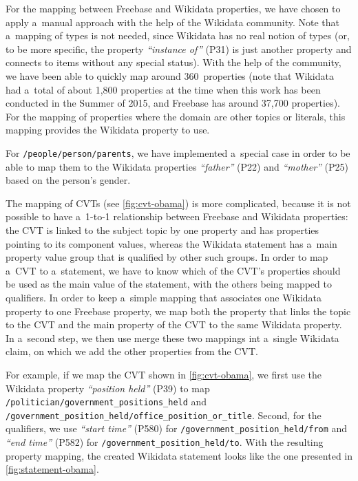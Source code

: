 \documentclass{sig-alternate-2013}
\begin{document}
For the mapping between Freebase and Wikidata properties, we have chosen to apply a~manual
approach with the help of the Wikidata community.
Note that a~mapping of types is not needed, since Wikidata has no real notion of types
(or, to be more specific, the property \textit{``instance of''} (P31) is just another
property and connects to items without any special status).
With the help of the community, we have been able to quickly map around 360~properties
(note that Wikidata had a~total of about 1,800 properties at the time when this work
has been conducted in the Summer of 2015, and Freebase has around 37,700 properties).
For the mapping of properties where the domain are other topics or literals,
this mapping provides the Wikidata property to use.

For \texttt{/people/person/parents}, we have implemented a~special case
in order to be able to map them to the Wikidata properties
\textit{``father''} (P22) and \textit{``mother''} (P25)
based on the person's gender.

The mapping of CVTs (see \autoref{fig:cvt-obama}) is more complicated,
because it is not possible to have a~\mbox{1-to-1} relationship
between Freebase and Wikidata properties: the CVT is linked to the subject topic by one property
and has properties pointing to its component values, whereas the Wikidata statement
has a~main property value group that is qualified by other such groups.
In order to map a~CVT to a~statement, we have to know which of the CVT's properties
should be used as the main value of the statement, with the others being mapped to qualifiers.
In order to keep a~simple mapping that associates one Wikidata property to one Freebase property,
we map both the property that links the topic to the CVT
and the main property of the CVT to the same Wikidata property. In a~second step, we
then use merge these two mappings int a~single Wikidata claim, on which we add the
other properties from the CVT.

For example, if we map the CVT shown in \autoref{fig:cvt-obama},
we first use the Wikidata property \textit{``position held''} (P39) to map
\texttt{/politician/government\_positions\_held} and \linebreak
\texttt{/government\_position\_held/office\_position\_or\_title}. \linebreak
Second, for the qualifiers, we use \textit{``start time''} (P580)
for \texttt{/government\_position\_held/from} and \textit{``end time''} (P582)
for \texttt{/government\_position\_held/to}.
With the resulting \linebreak property mapping, the created Wikidata statement
looks like the one presented in \autoref{fig:statement-obama}.
\end{document}
